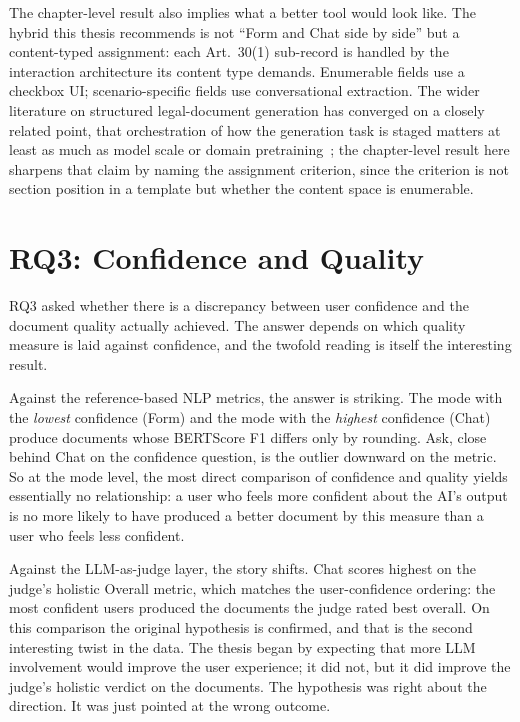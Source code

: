 The chapter-level result also implies what a better tool would
look like. The hybrid this thesis recommends is not ``Form and
Chat side by side'' but a content-typed assignment: each
Art.~30(1) sub-record is handled by the interaction
architecture its content type demands. Enumerable fields use a
checkbox UI; scenario-specific fields use conversational
extraction. The wider literature
on structured legal-document generation has converged on a
closely related point, that orchestration of how the
generation task is staged matters at least as much as model
scale or domain
pretraining~\cite{nigamStructuredLegalDocument2025,
liCaseGenBenchmarkMultiStage2025}; the chapter-level result
here sharpens that claim by naming the assignment criterion,
since the criterion is not section position in a template but
whether the content space is enumerable.


\section{RQ3: Confidence and Quality}
\label{sec:disc-rq3}

RQ3 asked whether there is a discrepancy between user confidence
and the document quality actually achieved. The answer depends
on which quality measure is laid against confidence, and the
twofold reading is itself the interesting result.

Against the reference-based NLP metrics, the answer is striking.
The mode with the \emph{lowest} confidence (Form) and the mode
with the \emph{highest} confidence (Chat) produce documents
whose BERTScore F1 differs only by rounding. Ask, close behind
Chat on the confidence question, is the outlier downward on the
metric. So at the mode level, the most direct comparison of
confidence and quality yields essentially no relationship: a
user who feels more confident about the AI's output is no more
likely to have produced a better document by this measure than
a user who feels less confident.

Against the LLM-as-judge layer, the story shifts. Chat scores
highest on the judge's holistic Overall metric, which matches
the user-confidence ordering: the most confident users produced
the documents the judge rated best overall. On this comparison
the original hypothesis is confirmed, and that is the second
interesting twist in the data. The thesis began by expecting
that more LLM involvement would improve the user experience; it
did not, but it did improve the judge's holistic verdict on the
documents. The hypothesis was right about the direction. It was
just pointed at the wrong outcome.

